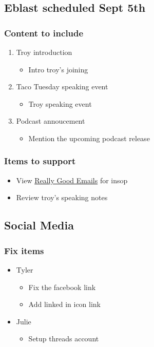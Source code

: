 \documentclass[11pt]{article}
\begin{document}
\subsection{Eblast scheduled Sept 5th}
\label{sec:orgb9a34e0}
\subsubsection{Content to include}
\label{sec:org9fa4962}
\begin{enumerate}
\item Troy introduction
\label{sec:orged63a16}
\begin{itemize}
\item Intro troy's joining
\end{itemize}
\item Taco Tuesday speaking event
\label{sec:org4440b3d}
\begin{itemize}
\item Troy  speaking event
\end{itemize}
\item Podcast annoucement
\label{sec:orga01837f}
\begin{itemize}
\item Mention the upcoming podcast release
\end{itemize}
\end{enumerate}
\subsubsection{Items to support}
\label{sec:orgde01727}
\begin{itemize}
\item View \href{https://reallygoodemails.com/}{Really Good Emails} for insop
\item Review troy's  speaking notes
\end{itemize}
\subsection{Social Media}
\label{sec:org54da446}
\subsubsection{Fix items}
\label{sec:org0559f47}
\begin{itemize}
\item Tyler
\begin{itemize}
\item Fix the facebook link
\item Add linked in icon link
\end{itemize}
\item Julie
\begin{itemize}
\item Setup threads account
\end{itemize}
\end{itemize}
\end{document}
